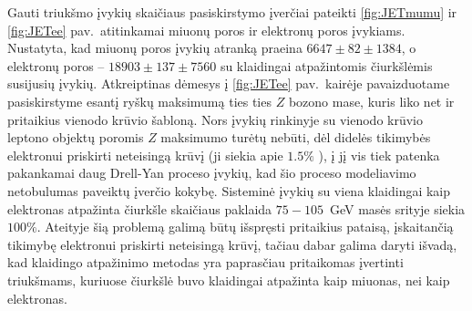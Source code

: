 \documentclass[a4paper, 12pt, oneside]{article}
\begin{document}
Gauti triukšmo įvykių skaičiaus pasiskirstymo įverčiai pateikti \ref{fig:JETmumu} ir \ref{fig:JETee} pav.\ atitinkamai
miuonų poros ir elektronų poros įvykiams.
Nustatyta, kad miuonų poros įvykių atranką praeina $6647\pm 82 \pm 1384$, o elektronų poros -- $18903\pm 137\pm 7560$
su klaidingai atpažintomis čiurkšlėmis susijusių įvykių.
Atkreiptinas dėmesys į \ref{fig:JETee} pav.\ kairėje pavaizduotame pasiskirstyme esantį ryškų maksimumą ties ties $Z$
bozono mase, kuris liko net ir pritaikius vienodo krūvio šabloną.
Nors įvykių rinkinyje su vienodo krūvio leptono objektų poromis $Z$ maksimumo turėtų nebūti, dėl didelės tikimybės elektronui
priskirti neteisingą krūvį (ji siekia apie $1.5\%$ \cite{EleID}), į jį vis tiek patenka pakankamai daug Drell-Yan proceso įvykių,
kad šio proceso modeliavimo netobulumas paveiktų įverčio kokybę.
Sisteminė įvykių su viena klaidingai kaip elektronas atpažinta čiurkšle skaičiaus paklaida $75-105$~GeV masės srityje siekia $100\%$.
Ateityje šią problemą galimą būtų išspręsti pritaikius pataisą, įskaitančią tikimybę elektronui priskirti neteisingą krūvį,
tačiau dabar galima daryti išvadą, kad klaidingo atpažinimo metodas yra paprasčiau pritaikomas įvertinti triukšmams, kuriuose
čiurkšlė buvo klaidingai atpažinta kaip miuonas, nei kaip elektronas.
\end{document}
